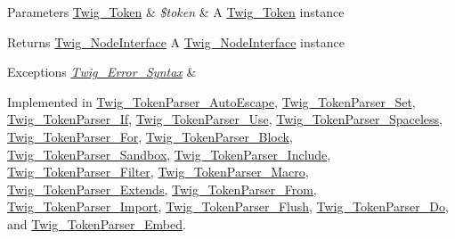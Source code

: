 \begin{DoxyParams}[1]{Parameters}
\hyperlink{class_twig___token}{Twig\+\_\+\+Token} & {\em \$token} & A \hyperlink{class_twig___token}{Twig\+\_\+\+Token} instance\\
\hline
\end{DoxyParams}
\begin{DoxyReturn}{Returns}
\hyperlink{interface_twig___node_interface}{Twig\+\_\+\+Node\+Interface} A \hyperlink{interface_twig___node_interface}{Twig\+\_\+\+Node\+Interface} instance
\end{DoxyReturn}

\begin{DoxyExceptions}{Exceptions}
{\em \hyperlink{class_twig___error___syntax}{Twig\+\_\+\+Error\+\_\+\+Syntax}} & \\
\hline
\end{DoxyExceptions}


Implemented in \hyperlink{class_twig___token_parser___auto_escape_a5dfa2e269321584fb74e8b43dabe0efd}{Twig\+\_\+\+Token\+Parser\+\_\+\+Auto\+Escape}, \hyperlink{class_twig___token_parser___set_a5dfa2e269321584fb74e8b43dabe0efd}{Twig\+\_\+\+Token\+Parser\+\_\+\+Set}, \hyperlink{class_twig___token_parser___if_a5dfa2e269321584fb74e8b43dabe0efd}{Twig\+\_\+\+Token\+Parser\+\_\+\+If}, \hyperlink{class_twig___token_parser___use_a5dfa2e269321584fb74e8b43dabe0efd}{Twig\+\_\+\+Token\+Parser\+\_\+\+Use}, \hyperlink{class_twig___token_parser___spaceless_a5dfa2e269321584fb74e8b43dabe0efd}{Twig\+\_\+\+Token\+Parser\+\_\+\+Spaceless}, \hyperlink{class_twig___token_parser___for_a5dfa2e269321584fb74e8b43dabe0efd}{Twig\+\_\+\+Token\+Parser\+\_\+\+For}, \hyperlink{class_twig___token_parser___block_a5dfa2e269321584fb74e8b43dabe0efd}{Twig\+\_\+\+Token\+Parser\+\_\+\+Block}, \hyperlink{class_twig___token_parser___sandbox_a5dfa2e269321584fb74e8b43dabe0efd}{Twig\+\_\+\+Token\+Parser\+\_\+\+Sandbox}, \hyperlink{class_twig___token_parser___include_a5dfa2e269321584fb74e8b43dabe0efd}{Twig\+\_\+\+Token\+Parser\+\_\+\+Include}, \hyperlink{class_twig___token_parser___filter_a5dfa2e269321584fb74e8b43dabe0efd}{Twig\+\_\+\+Token\+Parser\+\_\+\+Filter}, \hyperlink{class_twig___token_parser___macro_a5dfa2e269321584fb74e8b43dabe0efd}{Twig\+\_\+\+Token\+Parser\+\_\+\+Macro}, \hyperlink{class_twig___token_parser___extends_a5dfa2e269321584fb74e8b43dabe0efd}{Twig\+\_\+\+Token\+Parser\+\_\+\+Extends}, \hyperlink{class_twig___token_parser___from_a5dfa2e269321584fb74e8b43dabe0efd}{Twig\+\_\+\+Token\+Parser\+\_\+\+From}, \hyperlink{class_twig___token_parser___import_a5dfa2e269321584fb74e8b43dabe0efd}{Twig\+\_\+\+Token\+Parser\+\_\+\+Import}, \hyperlink{class_twig___token_parser___flush_a5dfa2e269321584fb74e8b43dabe0efd}{Twig\+\_\+\+Token\+Parser\+\_\+\+Flush}, \hyperlink{class_twig___token_parser___do_a5dfa2e269321584fb74e8b43dabe0efd}{Twig\+\_\+\+Token\+Parser\+\_\+\+Do}, and \hyperlink{class_twig___token_parser___embed_a5dfa2e269321584fb74e8b43dabe0efd}{Twig\+\_\+\+Token\+Parser\+\_\+\+Embed}.

